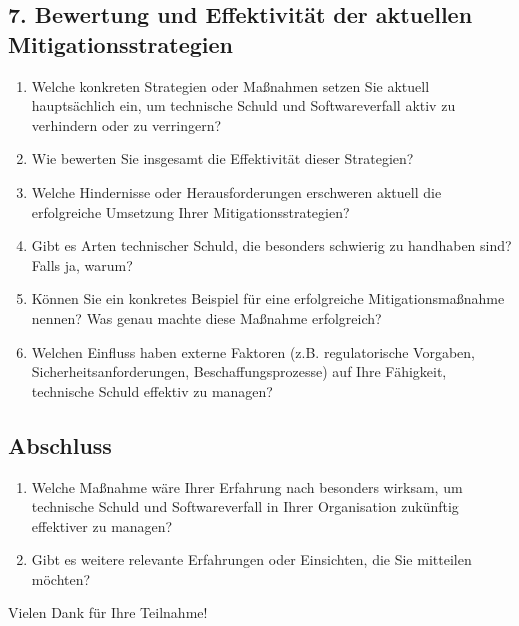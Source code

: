 \subsection*{7. Bewertung und Effektivität der aktuellen Mitigationsstrategien}

\begin{enumerate}[resume]
    \item Welche konkreten Strategien oder Maßnahmen setzen Sie aktuell hauptsächlich ein, um technische Schuld und Softwareverfall aktiv zu verhindern oder zu verringern?
    \item Wie bewerten Sie insgesamt die Effektivität dieser Strategien?
    \item Welche Hindernisse oder Herausforderungen erschweren aktuell die erfolgreiche Umsetzung Ihrer Mitigationsstrategien?
    \item Gibt es Arten technischer Schuld, die besonders schwierig zu handhaben sind? Falls ja, warum?
    \item Können Sie ein konkretes Beispiel für eine erfolgreiche Mitigationsmaßnahme nennen? Was genau machte diese Maßnahme erfolgreich?
    \item Welchen Einfluss haben externe Faktoren (z.B. regulatorische Vorgaben, Sicherheitsanforderungen, Beschaffungsprozesse) auf Ihre Fähigkeit, technische Schuld effektiv zu managen?
\end{enumerate}

\subsection*{Abschluss}

\begin{enumerate}[resume]
    \item Welche Maßnahme wäre Ihrer Erfahrung nach besonders wirksam, um technische Schuld und Softwareverfall in Ihrer Organisation zukünftig effektiver zu managen?
    \item Gibt es weitere relevante Erfahrungen oder Einsichten, die Sie mitteilen möchten?
\end{enumerate}

Vielen Dank für Ihre Teilnahme!
